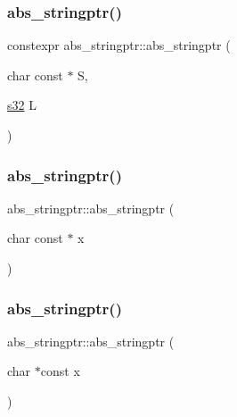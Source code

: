 \subsubsection{\texorpdfstring{abs\+\_\+stringptr()}{abs\_stringptr()}\hspace{0.1cm}{\footnotesize\ttfamily [3/6]}}
{\footnotesize\ttfamily constexpr abs\+\_\+stringptr\+::abs\+\_\+stringptr (\begin{DoxyParamCaption}\item[{char const $\ast$}]{S,  }\item[{\hyperlink{ab__common_8h_ae9b1af5c037e57a98884758875d3a7c4}{s32}}]{L }\end{DoxyParamCaption})\hspace{0.3cm}{\ttfamily [inline]}}

\mbox{\label{structabs__stringptr_af2ace78c334e1a27966aaf6fd57103e9}} 
\subsubsection{\texorpdfstring{abs\+\_\+stringptr()}{abs\_stringptr()}\hspace{0.1cm}{\footnotesize\ttfamily [4/6]}}
{\footnotesize\ttfamily abs\+\_\+stringptr\+::abs\+\_\+stringptr (\begin{DoxyParamCaption}\item[{char const $\ast$}]{x }\end{DoxyParamCaption})\hspace{0.3cm}{\ttfamily [inline]}}

\mbox{\label{structabs__stringptr_acd3fbc548742cd5fc66a8fc6e98b6cdd}} 
\subsubsection{\texorpdfstring{abs\+\_\+stringptr()}{abs\_stringptr()}\hspace{0.1cm}{\footnotesize\ttfamily [5/6]}}
{\footnotesize\ttfamily abs\+\_\+stringptr\+::abs\+\_\+stringptr (\begin{DoxyParamCaption}\item[{char $\ast$const}]{x }\end{DoxyParamCaption})\hspace{0.3cm}{\ttfamily [inline]}}

